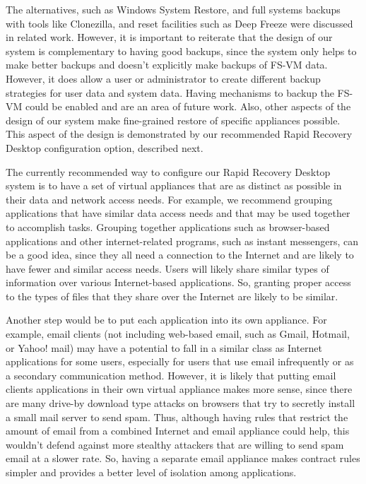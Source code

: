 The alternatives, such as Windows System Restore, and full systems backups with tools like Clonezilla, and reset facilities such as Deep Freeze were discussed in related work. However, it is important to reiterate that the design of our system is complementary to having good backups, since the system only helps to make better backups and doesn't explicitly make backups of FS-VM data.  However, it does allow a user or administrator to create different backup strategies for user data and system data. Having mechanisms to backup the FS-VM could be enabled and are an area of future work. Also, other aspects of the design of our system make fine-grained restore of specific appliances possible. This aspect of the design is demonstrated by our recommended Rapid Recovery Desktop configuration option, described next.

The currently recommended way to configure our Rapid Recovery Desktop system is to have a set of virtual appliances that are as distinct as possible in their data and network access needs. For example, we recommend grouping applications that have similar data access needs and that may be used together to accomplish tasks. Grouping together applications such as browser-based applications and other internet-related programs, such as instant messengers, can be a good idea, since they all need a connection to the Internet and are likely to have fewer and similar access needs. Users will likely share similar types of information over various Internet-based applications. So, granting proper access to the types of files that they share over the Internet are likely to be similar. 

Another step would be to put each application into its own appliance. For example, email clients (not including web-based email, such as Gmail, Hotmail, or Yahoo! mail) may have a potential to fall in a similar class as Internet applications for some users, especially for users that use email infrequently or as a secondary communication method. However, it is likely that putting email clients applications in their own virtual appliance makes more sense, since there are many drive-by download type attacks on browsers that try to secretly install a small mail server to send spam. Thus, although having rules that restrict the amount of email from a combined Internet and email appliance could help, this wouldn't defend against more stealthy attackers that are willing to send spam email at a slower rate. So, having a separate email appliance makes contract rules simpler and provides a better level of isolation among applications. 

